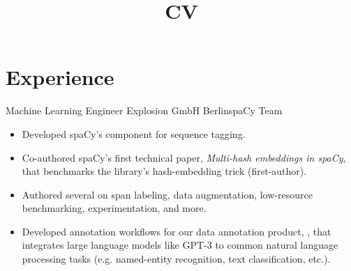 \documentclass[12pt,a4paper]{moderncv}
\title{CV}
\begin{document}
\maketitle


\section{Experience}

{Machine Learning Engineer}
{Explosion GmbH}
{Berlin}{spaCy Team}
{
    \begin{itemize}
        \item Developed spaCy's {\color{blue}} component for sequence
        tagging.
        \item Co-authored spaCy's first technical paper, \textit{Multi-hash
        embeddings in spaCy}, that benchmarks the library's hash-embedding trick
        (first-author).
        \item Authored several {\color{blue}} on span labeling,
        data augmentation, low-resource benchmarking, experimentation, and more.
        \item Developed annotation workflows for our data annotation product,
        {\color{blue}}, that integrates
        large language models like GPT-3 to common natural language processing
        tasks (e.g. named-entity recognition, text classification, etc.). 
    \end{itemize}
}
\vspace{0.5em}
\end{document}
